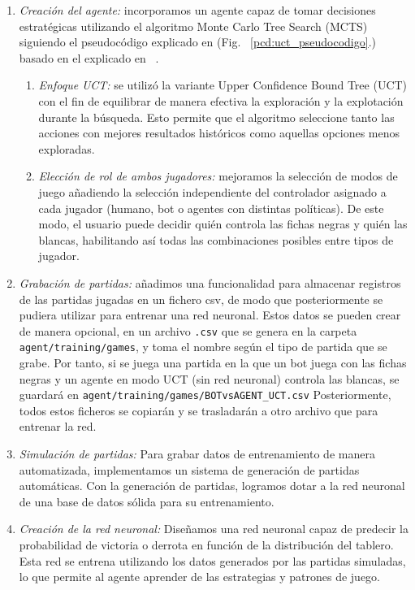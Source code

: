 \documentclass[conference,a4paper]{IEEEtran}
\begin{document}
\begin{enumerate}
\item \textit{Creación del agente:} incorporamos un agente capaz de tomar decisiones
 estratégicas utilizando el algoritmo Monte Carlo Tree Search (MCTS) siguiendo el pseudocódigo
 explicado en (Fig. ~\ref{pcd:uct_pseudocodigo}.) basado en el explicado en ~\cite{b9}.
  \begin{enumerate}
  \item \textit{Enfoque UCT:} se utilizó la variante Upper Confidence Bound Tree (UCT) 
  con el fin de equilibrar de manera efectiva la exploración y la explotación durante la búsqueda. 
  Esto permite que el algoritmo seleccione tanto las acciones con mejores resultados históricos
  como aquellas opciones menos exploradas.
  \item \textit{Elección de rol de ambos jugadores:} mejoramos la selección de modos de juego añadiendo
  la selección independiente del controlador asignado a cada jugador (humano, bot o agentes 
  con distintas políticas). De este modo, el usuario puede decidir quién controla las fichas negras 
  y quién las blancas, habilitando así todas las combinaciones posibles entre tipos de jugador.
  \end{enumerate}

\item \textit{Grabación de partidas:} añadimos una funcionalidad para almacenar registros 
  de las partidas jugadas en un fichero csv, de modo que posteriormente se pudiera utilizar
  para entrenar una red neuronal. Estos datos se pueden crear de manera opcional, en un 
  archivo \texttt{.csv} que se genera en la carpeta \texttt{agent/training/games}, y toma el
  nombre según el tipo de partida que se grabe. Por tanto, si se juega una partida en la 
  que un bot juega con las fichas negras y un agente en modo UCT (sin red neuronal) controla
  las blancas, se guardará en \texttt{agent/training/games/BOTvsAGENT\_UCT.csv} 
  Posteriormente, todos estos ficheros se copiarán y se trasladarán a otro archivo que para entrenar la red.

\item \textit{Simulación de partidas:}  Para grabar datos de entrenamiento de manera automatizada,
  implementamos un sistema de generación de partidas automáticas. Con la generación de partidas,
  logramos dotar a la red neuronal de una base de datos sólida para su entrenamiento.
  
\item \textit{Creación de la red neuronal:} Diseñamos una red neuronal capaz de predecir la probabilidad 
  de victoria o derrota en función de la distribución del tablero. Esta red se entrena utilizando los 
  datos generados por las partidas simuladas, lo que permite al agente aprender de las estrategias y 
  patrones de juego.


\end{enumerate}
\end{document}
